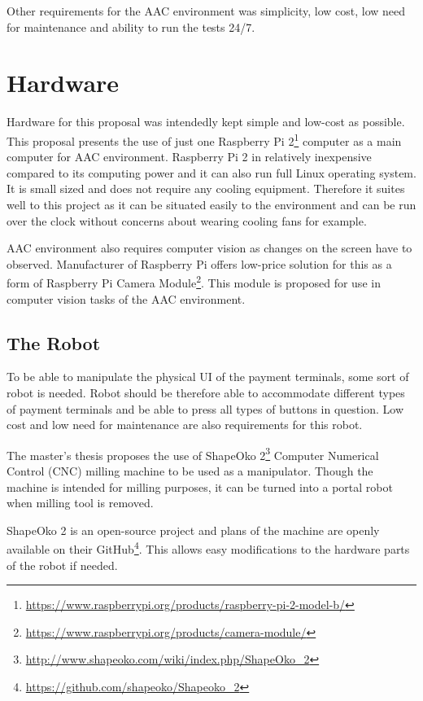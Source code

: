 Other requirements for the AAC environment was simplicity, low cost, low need for maintenance and ability to run the tests 24/7.

\section{Hardware}
\label{section:Proposed hardware}

Hardware for this proposal was intendedly kept simple and low-cost as possible. This proposal presents the use of just one Raspberry Pi 2\footnote{\url{https://www.raspberrypi.org/products/raspberry-pi-2-model-b/}} computer as a main computer for AAC environment. Raspberry Pi 2 in relatively inexpensive compared to its computing power and it can also run full Linux operating system. It is small sized and does not require any cooling equipment. Therefore it suites well to this project as it can be situated easily to the environment and can be run over the clock without concerns about wearing cooling fans for example.

AAC environment also requires computer vision as changes on the screen have to observed. Manufacturer of Raspberry Pi offers low-price solution for this as a form of Raspberry Pi Camera Module\footnote{\url{https://www.raspberrypi.org/products/camera-module/}}. This module is proposed for use in computer vision tasks of the AAC environment.

\FloatBarrier
\subsection{The Robot}

To be able to manipulate the physical UI of the payment terminals, some sort of robot is needed. Robot should be therefore able to accommodate different types of payment terminals and be able to press all types of buttons in question. Low cost and low need for maintenance are also requirements for this robot.

The master's thesis proposes the use of ShapeOko 2\footnote{\url{http://www.shapeoko.com/wiki/index.php/ShapeOko_2}} Computer Numerical Control (CNC) milling machine to be used as a manipulator. Though the machine is intended for milling purposes, it can be turned into a portal robot when milling tool is removed.

ShapeOko 2 is an open-source project and plans of the machine are openly available on their GitHub\footnote{\url{https://github.com/shapeoko/Shapeoko_2}}. This allows easy modifications to the hardware parts of the robot if needed.

